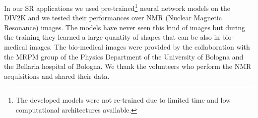 \documentclass{standalone}
\begin{document}
In our SR applications we used pre-trained\footnote{
  The developed models were not re-trained due to limited time and low computational architectures available.
} neural network models on the DIV2K and we tested their performances over NMR (Nuclear Magnetic Resonance) images.
The models have never seen this kind of images but during the training they learned a large quantity of shapes that can be  also in bio-medical images.
The bio-medical images were provided by the collaboration with the MRPM group of the Physics Department of the University of Bologna and the Bellaria hospital of Bologna.
We thank the volunteers who perform the NMR acquisitions and shared their data.
\end{document}
